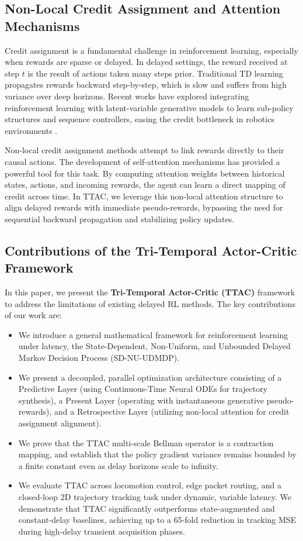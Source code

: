 \documentclass[manuscript, screen, review]{jair}
\begin{document}
\subsection{Non-Local Credit Assignment and Attention Mechanisms}
Credit assignment is a fundamental challenge in reinforcement learning, especially when rewards are sparse or delayed. In delayed settings, the reward received at step $t$ is the result of actions taken many steps prior. Traditional TD learning propagates rewards backward step-by-step, which is slow and suffers from high variance over deep horizons. Recent works have explored integrating reinforcement learning with latent-variable generative models to learn sub-policy structures and sequence controllers, easing the credit bottleneck in robotics environments \citep{ghadirzadeh2022training}.

Non-local credit assignment methods attempt to link rewards directly to their causal actions. The development of self-attention mechanisms \citep{vaswani2017attention} has provided a powerful tool for this task. By computing attention weights between historical states, actions, and incoming rewards, the agent can learn a direct mapping of credit across time. In TTAC, we leverage this non-local attention structure to align delayed rewards with immediate pseudo-rewards, bypassing the need for sequential backward propagation and stabilizing policy updates.

\subsection{Contributions of the Tri-Temporal Actor-Critic Framework}
In this paper, we present the \textbf{Tri-Temporal Actor-Critic (TTAC)} framework to address the limitations of existing delayed RL methods. The key contributions of our work are:
\begin{itemize}
    \item We introduce a general mathematical framework for reinforcement learning under latency, the State-Dependent, Non-Uniform, and Unbounded Delayed Markov Decision Process (SD-NU-UDMDP).
    \item We present a decoupled, parallel optimization architecture consisting of a Predictive Layer (using Continuous-Time Neural ODEs for trajectory synthesis), a Present Layer (operating with instantaneous generative pseudo-rewards), and a Retrospective Layer (utilizing non-local attention for credit assignment alignment).
    \item We prove that the TTAC multi-scale Bellman operator is a contraction mapping, and establish that the policy gradient variance remains bounded by a finite constant even as delay horizons scale to infinity.
    \item We evaluate TTAC across locomotion control, edge packet routing, and a closed-loop 2D trajectory tracking task under dynamic, variable latency. We demonstrate that TTAC significantly outperforms state-augmented and constant-delay baselines, achieving up to a 65-fold reduction in tracking MSE during high-delay transient acquisition phases.
\end{itemize}
\end{document}
